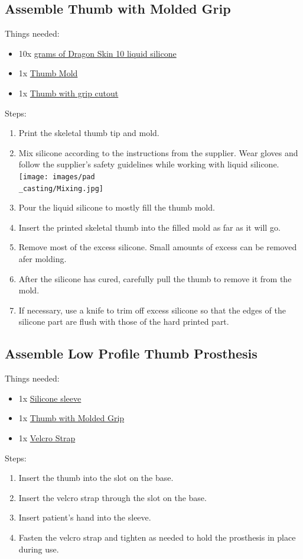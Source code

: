 \documentclass[11pt]{article}
\begin{document}
\subsection{Assemble Thumb with Molded Grip}
Things needed:
\begin{itemize}
\item 10x \hyperlink{thing_g\_dragon\_skin\_10}{grams of Dragon Skin 10 liquid silicone}
\item 1x \hyperlink{thing_thumb\_mold}{Thumb Mold}
\item 1x \hyperlink{thing_thumb\_with\_grip\_cutout}{Thumb with grip cutout}
\end{itemize}
Steps:
\begin{enumerate}
\item Print the skeletal thumb tip and mold.
\item Mix silicone according to the instructions from the supplier. Wear gloves and follow the supplier's safety guidelines while working with liquid silicone.\\ \texttt{[image: images/pad\\\_casting/Mixing.jpg]}
\item Pour the liquid silicone to mostly fill the thumb mold.
\item Insert the printed skeletal thumb into the filled mold as far as it will go.
\item Remove most of the excess silicone. Small amounts of excess can be removed afer molding.
\item After the silicone has cured, carefully pull the thumb to remove it from the mold.
\item If necessary, use a knife to trim off excess silicone so that the edges of the silicone part are flush with those of the hard printed part.
\end{enumerate}

\subsection{Assemble Low Profile Thumb Prosthesis}
Things needed:
\begin{itemize}
\item 1x \hyperlink{thing_silicone\_sleeve}{Silicone sleeve}
\item 1x \hyperlink{thing_molded\_thumb}{Thumb with Molded Grip}
\item 1x \hyperlink{thing_velcro\_strap}{Velcro Strap}
\end{itemize}
Steps:
\begin{enumerate}
\item Insert the thumb into the slot on the base.
\item Insert the velcro strap through the slot on the base.
\item Insert patient's hand into the sleeve.
\item Fasten the velcro strap and tighten as needed to hold the prosthesis in place during use.
\end{enumerate}

\newpage
\end{document}
